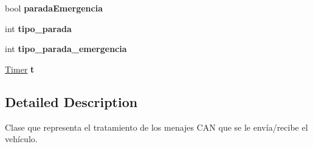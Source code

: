 \begin{DoxyCompactItemize}
\item 
\hypertarget{class_conduccion_thread_ae64f68126af967e86cf46620486bf961}{bool {\bfseries parada\-Emergencia}}\label{class_conduccion_thread_ae64f68126af967e86cf46620486bf961}

\item 
\hypertarget{class_conduccion_thread_a29640b1b31c6ca5d85e7640284e4bbf7}{int {\bfseries tipo\-\_\-parada}}\label{class_conduccion_thread_a29640b1b31c6ca5d85e7640284e4bbf7}

\item 
\hypertarget{class_conduccion_thread_a56fb420f61e01a9a98c397f95abdab7c}{int {\bfseries tipo\-\_\-parada\-\_\-emergencia}}\label{class_conduccion_thread_a56fb420f61e01a9a98c397f95abdab7c}

\item 
\hypertarget{class_conduccion_thread_aac780ac9687c7f507c919a748399654e}{\hyperlink{class_timer}{\-Timer} {\bfseries t}}\label{class_conduccion_thread_aac780ac9687c7f507c919a748399654e}

\end{DoxyCompactItemize}


\subsection{\-Detailed \-Description}
\-Clase que representa el tratamiento de los menajes \-C\-A\-N que se le envía/recibe el vehículo. 


